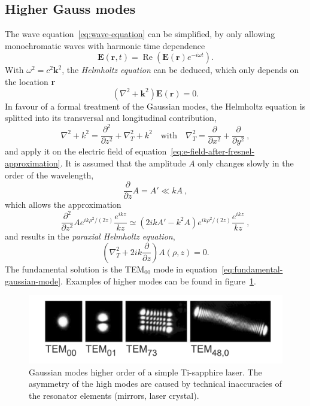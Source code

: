 \subsection{Higher Gauss modes}
The wave equation~\eqref{eq:wave-equation} can be simplified, by only allowing monochromatic waves with harmonic time dependence
\begin{equation}
\mathbf{E}(\mathbf{r},t) = \operatorname{Re}\left(\mathbf{E}(\mathbf{r})e^{-i\omega t}\right).
\end{equation}
With $\omega^2=c^2\mathbf{k}^2$, the \textit{Helmholtz equation} can be deduced, which only depends on the location \textbf{r}
\begin{equation}
\left(\nabla^2+\mathbf{k}^2\right)\mathbf{E}(\mathbf{r})=0.
\end{equation}
In favour of a formal treatment of the Gaussian modes, the Helmholtz equation is splitted into its transversal and longitudinal contribution,
\begin{equation}
\nabla^2+k^2=\frac{\partial^2}{\partial z^2} + \nabla_T^2+k^2
\quad\mathrm{with}\quad 
\nabla_T^2=\frac{\partial}{\partial x^2}+\frac{\partial}{\partial y^2} \ ,
\end{equation}
and apply it on the electric field of equation~\eqref{eq:e-field-after-fresnel-approximation}.
It is assumed that the amplitude $A$ only changes slowly in the order of the wavelength,
\begin{equation}
\frac{\partial}{\partial z} A = A' \ll kA \ ,
\end{equation}
which allows the approximation
\begin{equation}
\frac{\partial^2}{\partial z^2} A e^{ik\rho^2 /(2z)} \frac{e^{ikz}}{kz} \simeq (2ikA'-k^2A)e^{ik\rho^2/(2z)}\frac{e^{ikz}}{kz} \ ,
\end{equation}
and results in the \textit{paraxial Helmholtz equation},
\begin{equation}
\left(\nabla_T^2+2ik\frac{\partial}{\partial z}\right)A(\rho, z) = 0.
\end{equation}
The fundamental solution is the TEM$_{00}$ mode in equation~\eqref{eq:fundamental-gaussian-mode}. Examples of higher modes can be found in figure~\ref{fig:gauss-modes-higher-order}.
\begin{figure}[H]
	\centering
	\includegraphics[width=0.9\linewidth]{figures/fabry-perot/gauss-modes-higher-order}
	\caption[Gaussian modes higher order of a simple Ti-sapphire laser]{Gaussian modes higher order of a simple Ti-sapphire laser.
		The asymmetry of the high modes are caused by technical inaccuracies of the resonator elements (mirrors, laser crystal).}
	\label{fig:gauss-modes-higher-order}
\end{figure}



